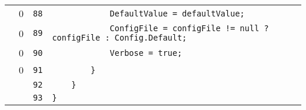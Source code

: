 \documentclass[a4paper,10pt]{article}
\begin{document}
\begin{longtable}[l]{lrrl}
\cellcolor{red} & 0 & \verb~88~ & \verb~            DefaultValue = defaultValue;~\\
\cellcolor{red} & 0 & \verb~89~ & \verb~            ConfigFile = configFile != null ? configFile : Config.Default;~\\
\cellcolor{red} & 0 & \verb~90~ & \verb~            Verbose = true;~\\
\cellcolor{red} & 0 & \verb~91~ & \verb~        }~\\
\cellcolor{gray} &  & \verb~92~ & \verb~    }~\\
\cellcolor{gray} &  & \verb~93~ & \verb~}~\\
\end{longtable}
\end{document}
